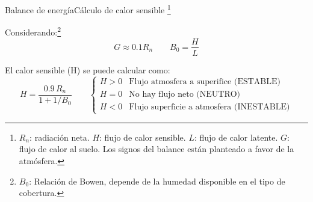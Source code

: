 \begin{frame}{Balance de energía}{Cálculo de calor sensible \footnote{ $R_n$: radiación neta. $H$: flujo de calor sensible. $L$: flujo de calor latente. $G$: flujo de calor al suelo. Los signos del balance están planteado a favor de la atmósfera.}}
 
\begin{center}
\end{center}
\vspace{-0.5em}
 
\pause
Considerando:\footnote{$B_0$: Relación de Bowen, depende de la humedad disponible en el tipo de cobertura.}
$$ G \approx 0.1 R_n \qquad B_0 =\dfrac{H}{L}  $$

\pause 
El calor sensible (H) se puede calcular como:
$$ 
H = \dfrac{0.9\,R_n}{ 1 + 1/B_0}
\qquad
\begin{cases}
    H>0  & \text{Flujo atmosfera a superifice (ESTABLE)}  \\
    H=0  & \text{No hay flujo neto (NEUTRO)}  \\
    H<0  & \text{Flujo superficie a atmosfera (INESTABLE)}
\end{cases}
$$
\end{frame}
 
